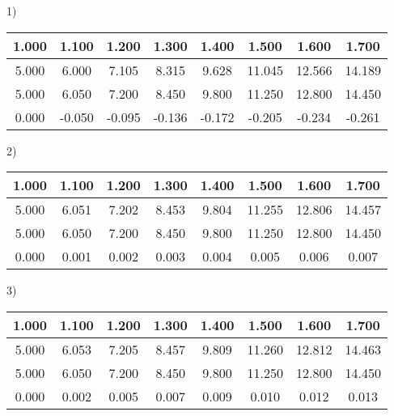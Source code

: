\documentclass[bachelor, och, pract]{SCWorks}
\begin{document}
1)

\begin{table}[H]
    \centering
    \begin{tabular}{|c|c|c|c|c|c|c|c|}
\hline 1.000& 1.100 &  1.200 & 1.300&  1.400 & 1.500&1.600 & 1.700\\\hline
     5.000 &6.000 & 7.105 & 8.315 & 9.628& 11.045 &12.566 & 14.189\\\hline
     5.000 &6.050&7.200& 8.450&9.800& 11.250&12.800&14.450\\\hline
     0.000&-0.050&-0.095&-0.136& -0.172&-0.205& -0.234&-0.261\\\hline

    \end{tabular}
\end{table}

2)

\begin{table}[H]
    \centering
    \begin{tabular}{|c|c|c|c|c|c|c|c|}
\hline 1.000 &1.100& 1.200&1.300 &1.400& 1.500&1.600 & 1.700\\\hline
     5.000 &6.051  &7.202& 8.453 &9.804 &11.255&12.806& 14.457\\\hline
     5.000& 6.050& 7.200& 8.450 &9.800 &11.250&12.800&14.450\\\hline
     0.000 &0.001 &0.002 &0.003 & 0.004 & 0.005 & 0.006  & 0.007\\\hline

    \end{tabular}
\end{table}

3)

\begin{table}[H]
    \centering
    \begin{tabular}{|c|c|c|c|c|c|c|c|}
\hline 1.000&1.100 &1.200 & 1.300& 1.400 &1.500& 1.600 & 1.700\\\hline
     5.000 &6.053& 7.205&8.457 & 9.809& 11.260&12.812 &14.463\\\hline
     5.000 &6.050&7.200& 8.450 &9.800& 11.250&12.800& 14.450\\\hline
     0.000 & 0.002 & 0.005& 0.007& 0.009 & 0.010& 0.012 & 0.013\\\hline

    \end{tabular}
\end{table}
\end{document}
